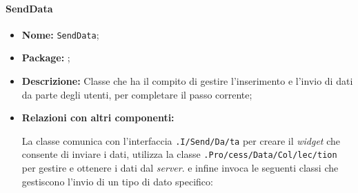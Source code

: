 \paragraph{SendData}
\begin{flushleft}
\begin{itemize}
\item \textbf{Nome:} \texttt{SendData};
\item \textbf{Package:} \texttt{\logicUser};
\item \textbf{Descrizione:} Classe che ha il compito di gestire l'inserimento e l'invio di dati da parte degli utenti, per completare il passo corrente;
\item \textbf{Relazioni con altri componenti:}
\begin{sloppypar}
La classe comunica con l'interfaccia \texttt{\viewUser{}.I\fshyp{}Send\fshyp{}Da\fshyp{}ta} per creare il \textit{widget} che consente di inviare i dati, utilizza la classe \texttt{\collectionu{}.Pro\fshyp{}cess\fshyp{}Data\fshyp{}Col\fshyp{}lec\fshyp{}tion} per gestire e ottenere i dati dal \textit{server}. e infine invoca le seguenti classi che gestiscono l'invio di un tipo di dato specifico:
\end{sloppypar}
\end{itemize}
\end{flushleft}